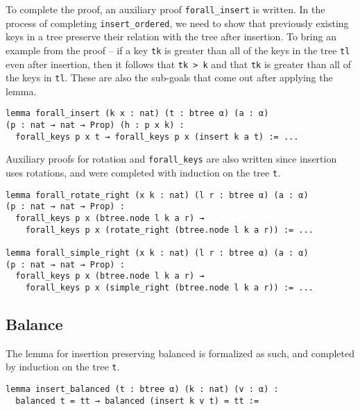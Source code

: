 To complete the proof, an auxiliary proof \lstinline{forall_insert} is written. In the process of completing \lstinline{insert_ordered}, we need to show that previously existing keys in a tree preserve their relation with the tree after insertion. To bring an example from the proof -- if a key \lstinline{tk} is greater than all of the keys in the tree \lstinline{tl} even after insertion, then it follows that \lstinline{tk > k} and that \lstinline{tk} is greater than all of the keys in \lstinline{tl}. These are also the sub-goals that come out after applying the lemma. 

\begin{lstlisting}
lemma forall_insert (k x : nat) (t : btree α) (a : α) 
(p : nat → nat → Prop) (h : p x k) :
  forall_keys p x t → forall_keys p x (insert k a t) := ...
\end{lstlisting}

Auxiliary proofs for rotation and \lstinline{forall_keys} are also written since insertion uses rotations, and were completed with induction on the tree \lstinline{t}.

\begin{lstlisting}
lemma forall_rotate_right (x k : nat) (l r : btree α) (a : α) 
(p : nat → nat → Prop) :
  forall_keys p x (btree.node l k a r) → 
    forall_keys p x (rotate_right (btree.node l k a r)) := ...

lemma forall_simple_right (x k : nat) (l r : btree α) (a : α) 
(p : nat → nat → Prop) :
  forall_keys p x (btree.node l k a r) → 
    forall_keys p x (simple_right (btree.node l k a r)) := ...
\end{lstlisting}

\subsection*{Balance}
The lemma for insertion preserving balanced is formalized as such, and completed by induction on the tree \lstinline{t}.

\begin{lstlisting}
lemma insert_balanced (t : btree α) (k : nat) (v : α) :
  balanced t = tt → balanced (insert k v t) = tt :=
\end{lstlisting}


